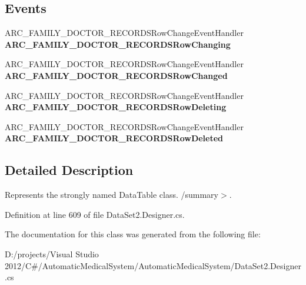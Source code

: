 \subsection*{Events}
\begin{CompactItemize}
\item 
ARC\_\-FAMILY\_\-DOCTOR\_\-RECORDSRowChangeEventHandler \textbf{ARC\_\-FAMILY\_\-DOCTOR\_\-RECORDSRowChanging}\label{class_automatic_medical_system_1_1_data_set2_1_1_a_r_c___f_a_m_i_l_y___d_o_c_t_o_r___r_e_c_o_r_d_s_data_table_d027b6e66de7e65cc8a84e05c9f32405}

\item 
ARC\_\-FAMILY\_\-DOCTOR\_\-RECORDSRowChangeEventHandler \textbf{ARC\_\-FAMILY\_\-DOCTOR\_\-RECORDSRowChanged}\label{class_automatic_medical_system_1_1_data_set2_1_1_a_r_c___f_a_m_i_l_y___d_o_c_t_o_r___r_e_c_o_r_d_s_data_table_c271bbcb9df61edf19437a81c6d82b24}

\item 
ARC\_\-FAMILY\_\-DOCTOR\_\-RECORDSRowChangeEventHandler \textbf{ARC\_\-FAMILY\_\-DOCTOR\_\-RECORDSRowDeleting}\label{class_automatic_medical_system_1_1_data_set2_1_1_a_r_c___f_a_m_i_l_y___d_o_c_t_o_r___r_e_c_o_r_d_s_data_table_22800e9f569fd6f2f54407da080fd77e}

\item 
ARC\_\-FAMILY\_\-DOCTOR\_\-RECORDSRowChangeEventHandler \textbf{ARC\_\-FAMILY\_\-DOCTOR\_\-RECORDSRowDeleted}\label{class_automatic_medical_system_1_1_data_set2_1_1_a_r_c___f_a_m_i_l_y___d_o_c_t_o_r___r_e_c_o_r_d_s_data_table_f0853e9d05405c45c01f60794ad3d05d}

\end{CompactItemize}


\subsection{Detailed Description}
Represents the strongly named DataTable class. /summary$>$. 

Definition at line 609 of file DataSet2.Designer.cs.

The documentation for this class was generated from the following file:\begin{CompactItemize}
\item 
D:/projects/Visual Studio 2012/C\#/AutomaticMedicalSystem/AutomaticMedicalSystem/DataSet2.Designer.cs\end{CompactItemize}
